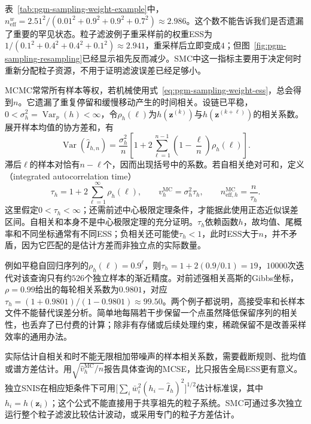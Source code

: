 表~\ref{tab:pgm-sampling-weight-example}中，$n_{\mathrm{eff}}^w=2.51^2/(0.01^2+0.9^2+0.9^2+0.7^2)\approx2.986$。这个数不能告诉我们是否遗漏了重要的罕见状态。粒子滤波例子重采样前的权重ESS为$1/(0.1^2+0.4^2+0.4^2+0.1^2)\approx2.941$，重采样后立即变成$4$；但图~\ref{fig:pgm-sampling-resampling}已经显示祖先反而减少。SMC中这一指标主要用于决定何时重新分配粒子资源，不用于证明滤波误差已经足够小。

MCMC常常所有样本等权，若机械使用式~\eqref{eq:pgm-sampling-weight-ess}，总会得到$n$。它遗漏了重复停留和缓慢移动产生的时间相关。设链已平稳，$0<\sigma_h^2=\operatorname{Var}_p(h)<\infty$，令$\rho_h(\ell)$为$h(\bm{z}^{(k)})$与$h(\bm{z}^{(k+\ell)})$的相关系数。展开样本均值的协方差和，有
\begin{equation}
  \operatorname{Var}(\widehat I_{h,n})
    =\frac{\sigma_h^2}{n}
      \left[1+2\sum_{\ell=1}^{n-1}
          \left(1-\frac{\ell}{n}\right)\rho_h(\ell)\right].
  \label{eq:pgm-sampling-autocorrelation-variance}
\end{equation}
滞后$\ell$的样本对恰有$n-\ell$个，因而出现括号中的系数。若自相关绝对可和，定义（integrated autocorrelation time）
\begin{equation}
  \tau_h=1+2\sum_{\ell=1}^{\infty}\rho_h(\ell),\qquad
  v_h^{\mathrm{MC}}=\sigma_h^2\tau_h,\qquad
  n_{\mathrm{eff},h}^{\mathrm{MC}}=\frac{n}{\tau_h}.
  \label{eq:pgm-sampling-mcmc-ess}
\end{equation}
这里假定$0<\tau_h<\infty$；还需前述中心极限定理条件，才能据此使用正态近似误差区间。自相关和本身不是中心极限定理的充分证明。$\tau_h$依赖函数$h$，故均值、尾概率和不同坐标通常有不同ESS；负相关还可能使$\tau_h<1$，此时ESS大于$n$，并不矛盾，因为它匹配的是估计方差而非独立点的实际数量。

例如平稳自回归序列的$\rho_h(\ell)=0.9^\ell$，则$\tau_h=1+2(0.9/0.1)=19$，$10000$次迭代对该查询只有约$526$个独立样本的渐近精度。对前述强相关高斯的Gibbs坐标，$\rho=0.99$给出的每轮相关系数为$0.9801$，对应$\tau_h=(1+0.9801)/(1-0.9801)\approx99.50$。两个例子都说明，高接受率和长样本文件不能替代误差分析。简单地每隔若干步保留一个点虽然降低保留序列的相关性，也丢弃了已付费的计算；除非有存储或后续处理约束，稀疏保留不是改善采样效率的通用办法。

实际估计自相关和时不能无限相加带噪声的样本相关系数，需要截断规则、批均值或谱方差估计。用$\sqrt{\widehat v_h^{\mathrm{MC}}/n}$报告具体查询的MCSE，比只报告全局ESS更有意义。独立SNIS在相应矩条件下可用$\bigl[\sum_i\bar w_i^2(h_i-\widehat I_h)^2\bigr]^{1/2}$估计标准误，其中$h_i=h(\bm{z}_i)$；这个公式不能直接用于共享祖先的粒子系统。SMC可通过多次独立运行整个粒子滤波比较估计波动，或采用专门的粒子方差估计。

